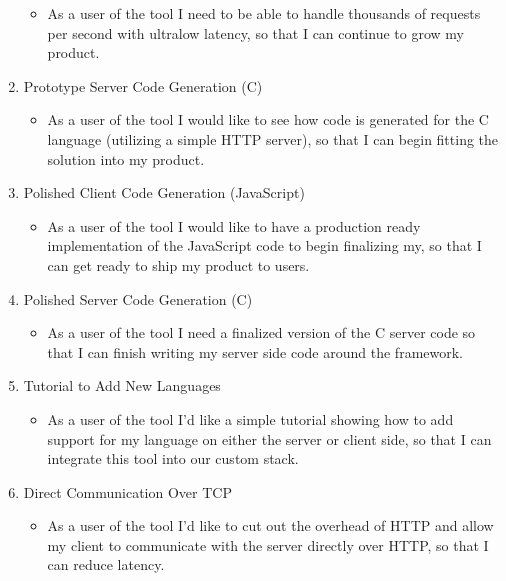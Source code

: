\documentclass[11pt]{article}
\begin{document}
\begin{enumerate}
\begin{itemize}
\item As a user of the tool I need to be able to handle thousands of requests per second with ultralow latency, so that I can continue to grow my product.\\
\end{itemize}
\item Prototype Server Code Generation (C)\\
\begin{itemize}
\item As a user of the tool I would like to see how code is generated for the C language (utilizing a simple HTTP server), so that I can begin fitting the solution into my product.\\
\end{itemize}
\item Polished Client Code Generation (JavaScript)\\
\begin{itemize}
\item As a user of the tool I would like to have a production ready implementation of the JavaScript code to begin finalizing my, so that I can get ready to ship my product to users.\\
\end{itemize}
\item Polished Server Code Generation (C)\\
\begin{itemize}
\item As a user of the tool I need a finalized version of the C server code so that I can finish writing my server side code around the framework.\\
\end{itemize}
\item Tutorial to Add New Languages\\
\begin{itemize}
\item As a user of the tool I'd like a simple tutorial showing how to add support for my language on either the server or client side, so that I can integrate this tool into our custom stack.\\
\end{itemize}
\item Direct Communication Over TCP\\
\begin{itemize}
\item As a user of the tool I'd like to cut out the overhead of HTTP and allow my client to communicate with the server directly over HTTP, so that I can reduce latency.\\
\end{itemize}
\end{enumerate}
\end{document}
